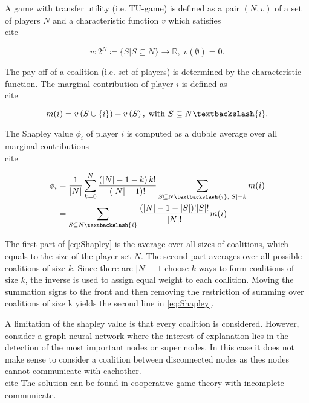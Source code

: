\documentclass[twoside,twocolumn,9pt]{article}
\begin{document}
A game with transfer utility (i.e. TU-game) is defined as a pair $\left(N, v\right)$ of a set 
of players $N$ and a characteristic function $v$ which satisfies\\cite{}

\begin{equation}
    v: 2^N \coloneqq \{S | S \subseteq N\} \rightarrow \mathbb{R}, \; v\left(\emptyset\right) = 0.
\end{equation}

The pay-off of a coalition (i.e. set of players) is determined by the characteristic 
function. The marginal contribution of player $i$ is defined as\\cite{}

\begin{equation}
    m(i) = v\left(S \cup \{i\}\right) - v\left(S\right), \; \text{with } S \subseteq N \textbackslash \{i\}.
\end{equation}

The Shapley value $\phi_i$ of player $i$ is computed as a dubble average over all marginal contributions\\cite{}

\begin{equation}
    \label{eq:Shapley}
\begin{split}
    \phi_i & = \frac{
        1
    }{
        |N|
    } \sum_{
        k=0
    }^N \frac{
        \left(|N| - 1 - k\right)k!
    }{
        \left(|N| - 1\right)!
    } \sum_{
        S \subseteq N \textbackslash \{i\}, |S| = k
    } m(i) \\
    & = \sum_{
        S \subseteq N \textbackslash \{i\}
    } \frac{
        \left(|N| - 1 - |S| \right)!|S|!
    }{
        |N|!
    } m(i)
\end{split}
\end{equation}

The first part of \cref{eq:Shapley} is the average over all sizes of coalitions, which 
equals to the size of the player set $N$. The second part averages over all possible coalitions 
of size $k$. Since there are $|N| - 1$ choose $k$ ways to form coalitions of size $k$, the inverse 
is used to assign equal weight to each coalition. Moving the summation signs to the front and 
then removing the restriction of summing over coalitions of size k yields the second line in 
\cref{eq:Shapley}. 

A limitation of the shapley value is that every coalition is considered. However, consider 
a graph neural network where the interest of explanation lies in the detection of the most 
important nodes or super nodes. In this case it does not make sense to consider a coalition 
between disconnected nodes as thes nodes cannot communicate with eachother.\\cite{} The 
solution can be found in cooperative game theory with incomplete communicate.
\end{document}
